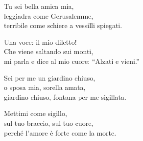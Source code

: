 

\spazio

\strofa Tu sei bella amica mia,\\
leggiadra come Gerusalemme,\\
terribile come schiere a vessilli spiegati.

\spazio


\spazio

\strofa Una voce: il mio diletto!\\
Che viene saltando sui monti,\\
mi parla e dice al mio cuore: ``Alzati e vieni.''

\spazio


\spazio

\strofa Sei per me un giardino chiuso,\\
o sposa mia, sorella amata,\\
giardino chiuso, fontana per me sigillata.

\spazio


\spazio

\strofa Mettimi come sigillo,\\
sul tuo braccio, sul tuo cuore,\\
perché l'amore è forte come la morte.

\spazio

